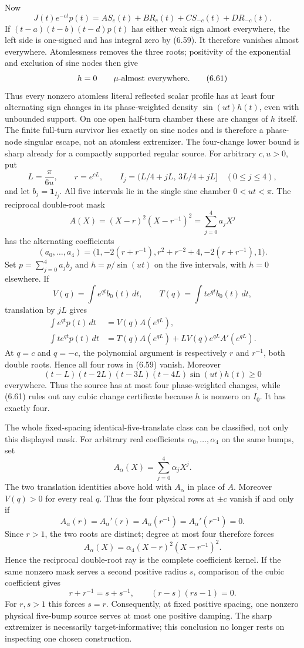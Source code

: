 \documentclass[11pt]{article}
\theoremstyle{definition}
\theoremstyle{remark}
\begin{document}
Now
\[
 J(t)e^{-ct}p(t)
 =A S_c(t)+B R_c(t)+C S_{-c}(t)+D R_{-c}(t).
\]
If $(t-a)(t-b)(t-d)p(t)$ has either weak sign almost everywhere, the left side is one-signed and
has integral zero by (6.59).  It therefore vanishes almost everywhere.  Atomlessness removes the
three roots; positivity of the exponential and exclusion of sine nodes then give
\[
 h=0\qquad\mu\hbox{-almost everywhere}.                \tag{6.61}
\]
Thus every nonzero atomless literal reflected scalar profile has at least four alternating sign
changes in its phase-weighted density $\sin(ut)h(t)$, even with unbounded support.  On one open
half-turn chamber these are changes of $h$ itself.  The finite full-turn survivor lies exactly on
sine nodes and is therefore a phase-node singular escape, not an atomless extremizer.  The
four-change lower bound is sharp already for a compactly supported regular source.  For arbitrary
$c,u>0$, put
\[
 L=\frac{\pi}{6u},\qquad r=e^{cL},\qquad
 I_j=(L/4+jL,\,3L/4+jL]\quad(0\leq j\leq4),
\]
and let $b_j=\mathbf 1_{I_j}$.  All five intervals lie in the single sine chamber
$0<ut<\pi$.  The reciprocal double-root mask
\[
 A(X)=(X-r)^2(X-r^{-1})^2=\sum_{j=0}^4a_jX^j
\]
has the alternating coefficients
\[
 (a_0,\ldots,a_4)
 =\bigl(1,-2(r+r^{-1}),r^2+r^{-2}+4,-2(r+r^{-1}),1\bigr).
\]
Set $p=\sum_{j=0}^4a_jb_j$ and $h=p/\sin(ut)$ on the five intervals, with $h=0$ elsewhere.
If
\[
 V(q)=\int e^{qt}b_0(t)\,dt,\qquad
 T(q)=\int te^{qt}b_0(t)\,dt,
\]
translation by $jL$ gives
\[
\begin{aligned}
 \int e^{qt}p(t)\,dt
   &=V(q)A(e^{qL}),\\
 \int te^{qt}p(t)\,dt
   &=T(q)A(e^{qL})+LV(q)e^{qL}A'(e^{qL}).
\end{aligned}
\]
At $q=c$ and $q=-c$, the polynomial argument is respectively $r$ and $r^{-1}$, both double
roots.  Hence all four rows in (6.59) vanish.  Moreover
\[
 (t-L)(t-2L)(t-3L)(t-4L)\sin(ut)h(t)\geq0
\]
everywhere.  Thus the source has at most four phase-weighted changes, while (6.61) rules out any
cubic change certificate because $h$ is nonzero on $I_0$.  It has exactly four.

The whole fixed-spacing identical-five-translate class can be classified, not only this displayed
mask.  For arbitrary real coefficients $\alpha_0,\ldots,\alpha_4$ on the same bumps, set
\[
 A_\alpha(X)=\sum_{j=0}^4\alpha_jX^j.
\]
The two translation identities above hold with $A_\alpha$ in place of $A$.  Moreover $V(q)>0$
for every real $q$.  Thus the four physical rows at $\pm c$ vanish if and only if
\[
 A_\alpha(r)=A_\alpha'(r)
 =A_\alpha(r^{-1})=A_\alpha'(r^{-1})=0.
\]
Since $r>1$, the two roots are distinct; degree at most four therefore forces
\[
 A_\alpha(X)=\alpha_4(X-r)^2(X-r^{-1})^2.
\]
Hence the reciprocal double-root ray is the complete coefficient kernel.  If the same nonzero
mask serves a second positive radius $s$, comparison of the cubic coefficient gives
\[
 r+r^{-1}=s+s^{-1},\qquad (r-s)(rs-1)=0.
\]
For $r,s>1$ this forces $s=r$.  Consequently, at fixed positive spacing, one nonzero physical
five-bump source serves at most one positive damping.  The sharp extremizer is necessarily
target-informative; this conclusion no longer rests on inspecting one chosen construction.
\end{document}
